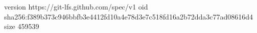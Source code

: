 version https://git-lfs.github.com/spec/v1
oid sha256:f389b373c946bbfb3e4412fd10a4e78d3e7c518fd16a2b72dda3c77ad08616d4
size 459539
